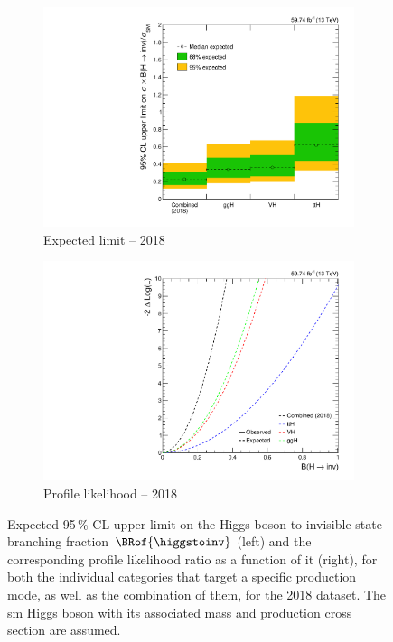 \begin{figure}[htbp]
    \centering
    \begin{subfigure}[t]{0.45\textwidth}
        \includegraphics[width=\textwidth]{figures/limits/per_year/limit_2018_comb_Scenario5.pdf}
        \caption{Expected limit -- 2018}
    \end{subfigure}
    \hspace{0.05\textwidth}
    \begin{subfigure}[t]{0.45\textwidth}
        \includegraphics[width=\textwidth]{figures/likelihood_scan/profile_likelihood_scan_2018_Scenario5.pdf}
        \caption{Profile likelihood -- 2018}
    \end{subfigure}
    \caption[Expected 95\,\% CL upper limit on the Higgs boson to invisible state branching fraction $\BRof{\higgstoinv}$ and the corresponding profile likelihood ratio as a function of it, for both the individual categories that target a specific production mode, as well as the combination of them, for the 2018 dataset]{Expected 95\,\% CL upper limit on the Higgs boson to invisible state branching fraction $\BRof{\higgstoinv}$ (left) and the corresponding profile likelihood ratio as a function of it (right), for both the individual categories that target a specific production mode, as well as the combination of them, for the 2018 dataset. The \acrlong{sm} Higgs boson with its associated mass and production cross section are assumed.}
    \label{fig:htoinv_limit_likelihood_2018}
\end{figure}

